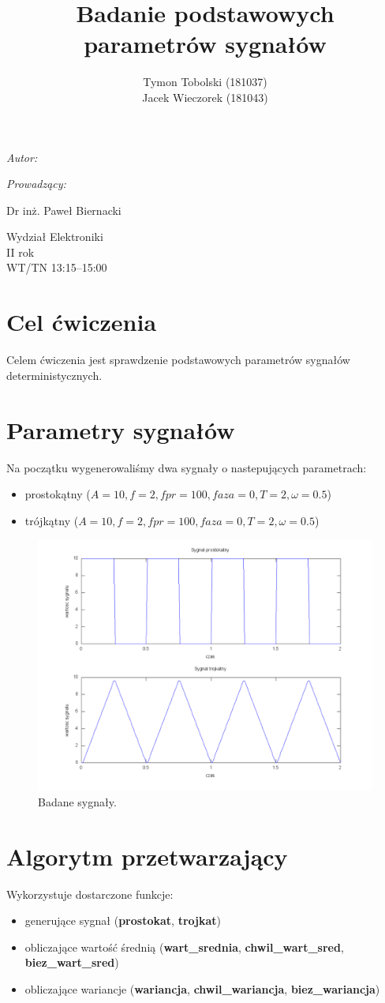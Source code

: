 \documentclass[wide,a4paper,titlepage,12pt]{mwart}
\title{Badanie podstawowych parametrów sygnałów}
\author{Tymon Tobolski (181037)\\\small Jacek Wieczorek (181043)}
\makeatletter
\renewcommand{\maketitle}{
\begin{titlepage}
  \begin{center}
    \vspace*{3cm}
    \LARGE \@title \par
    \vspace{2cm}
    \textit{\small Autor:}\par
    \normalsize \@author\par \normalsize
    \vspace{3cm}
    \textit{\small Prowadzący:}\par
    Dr inż. Paweł Biernacki \par
    \vspace{2cm}
    Wydział Elektroniki\\ II rok\\ WT/TN 13:15--15:00 \par
    \vspace{5cm}
    \small \@date
  \end{center}
\end{titlepage}
}
\makeatother
\begin{document}
  \maketitle
  \section{Cel ćwiczenia} %
  \label{sec:Cel}
    Celem ćwiczenia jest sprawdzenie podstawowych parametrów sygnałów deterministycznych. 
    
  \section{Parametry sygnałów}
    Na początku wygenerowaliśmy dwa sygnały o nastepujących parametrach:
    \begin{itemize}
      \item prostokątny ($A=10, f=2, fpr=100, faza=0, T=2, \omega=0.5$) 
      \item trójkątny ($A=10, f=2, fpr=100, faza=0, T=2, \omega=0.5$)
    \end{itemize}
    
    \begin{figure}[htbp]
      \begin{center}
        \includegraphics[scale=.4]{out/Figure1.png}
        \caption{\label{wykres1}Badane sygnały.}
      \end{center}
    \end{figure}
    
  \section{Algorytm przetwarzający}
    Wykorzystuje dostarczone funkcje:
    \newline
    \begin{itemize}
      \item generujące sygnał (\textbf{prostokat}, \textbf{trojkat})
      \item obliczające wartość średnią (\textbf{wart\_srednia}, \textbf{chwil\_wart\_sred}, \textbf{biez\_wart\_sred})
      \item obliczające wariancje (\textbf{wariancja}, \textbf{chwil\_wariancja}, \textbf{biez\_wariancja})
    \end{itemize}
  
\end{document}
